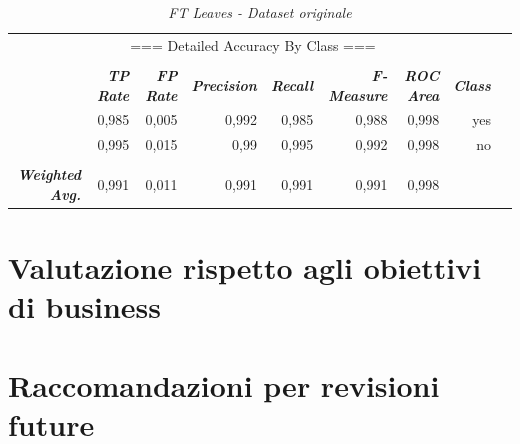 \begin{table}[H]
{\begin{tabular}{|rrrrrrrrr|}
			&            &            &            &            &            &            &            &            \\
			\hline
			\multicolumn{ 8}{|c}{=== Detailed Accuracy By Class ===} &            \\
			
			&            &            &            &            &            &            &            &            \\
			
			& {\it {\bf TP Rate}} & {\it {\bf FP Rate}} & {\it {\bf Precision}} & {\it {\bf Recall}} & {\it {\bf F-Measure}} & {\it {\bf ROC Area}} & {\it {\bf Class}} &            \\
			
			&      0,985 &      0,005 &      0,992 &      0,985 &      0,988 &      0,998 &        yes &            \\
			
			&      0,995 &      0,015 &       0,99 &      0,995 &      0,992 &      0,998 &         no &            \\
			
			&            &            &            &            &            &            &            &            \\
			
			{\it {\bf Weighted Avg.}} &      0,991 &      0,011 &      0,991 &      0,991 &      0,991 &      0,998 &            &            \\
			\hline
		\end{tabular}  
		
	}
	\caption{\emph{FT Leaves - Dataset originale}}
\end{table}
\section{Valutazione rispetto agli obiettivi di business}

\section{Raccomandazioni per revisioni future}
